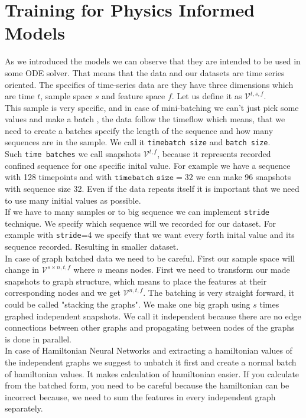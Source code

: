 \section{Training for Physics Informed Models}
As we introduced the models we can observe that they are intended to be used in some ODE solver. That means that the data and our datasets are time series oriented. The specifics of time-series data are they have three dimensions which are time $t$, sample space $s$ and feature space $f$. Let us define it as $\mathcal{V}^{t,s,f}$.\\
This sample is very specific, and in case of mini-batching we can't just pick some values and make a batch , the data follow the timeflow which means, that we need to create a batches specify the length of the sequence and how many sequences are in the sample. We call it \texttt{timebatch size} and \texttt{batch size}.\\
Such \texttt{time batches} we call snapshots $\mathcal{V}^{t,f}$, because it represents recorded confined sequence for one specific inital value. For example we have a sequence with 128 timepoints and with $\texttt{timebatch size} = 32$ we can make 96 snapshots with sequence size 32. Even if the data repeats itself it is important that we need to use many initial values as possible.\\
If we have to many samples or to big sequence we can implement \texttt{stride} technique. We specify which sequence will we recorded for our dataset. For example with \texttt{stride}=4 we specify that we want every forth inital value and its sequence recorded. Resulting in smaller dataset.\\
In case of graph batched data we need to be careful. First our sample space will change in $\mathcal{V}^{s \times n,t,f}$ where  $n$ means nodes. First we need to transform our made snapshots to graph structure, which means to place the features at their corresponding nodes and we get $\mathcal{V}^{n,t,f}$. The batching is very straight forward, it could be called "stacking the graphs". We make one big graph using $s$ times graphed independent snapshots. We call it independent because there are no edge connections between other graphs and propagating between nodes of the graphs is done in parallel.\\
In case of Hamiltonian Neural Networks and extracting a hamiltonian values of the independent graphs we suggest to unbatch it first and create a normal batch of hamiltonian values. It makes calculation of hamiltonian easier. If you calculate from the batched form, you need to be careful because the  hamiltonian can be incorrect because, we need to sum the features in every  independent graph separately.      


